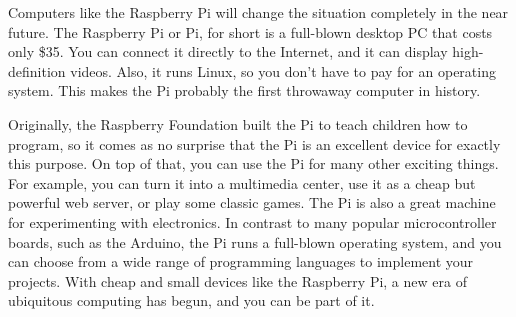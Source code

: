 Computers like the Raspberry Pi will change the situation completely in the
near future. The Raspberry Pi or Pi, for short is a full-blown desktop PC
that costs only \$35. You can connect it directly to the Internet, and it can
display high-definition videos. Also, it runs Linux, so you don’t have to pay
for an operating system. This makes the Pi probably the first throwaway
computer in history.

Originally, the Raspberry Foundation \citep{2} built the Pi to teach children how to
program, so it comes as no surprise that the Pi is an excellent device for
exactly this purpose. 
On top of that, you can use the Pi for many other
exciting things. For example, you can turn it into a multimedia center, use it as a cheap but powerful web server, or play some classic games.
The Pi is also a great machine for experimenting with electronics. In contrast
to many popular microcontroller boards, such as the Arduino, the Pi runs a
full-blown operating system, and you can choose from a wide range of programming
languages to implement your projects.
With cheap and small devices like the Raspberry Pi, a new era of ubiquitous
computing has begun, and you can be part of it.


